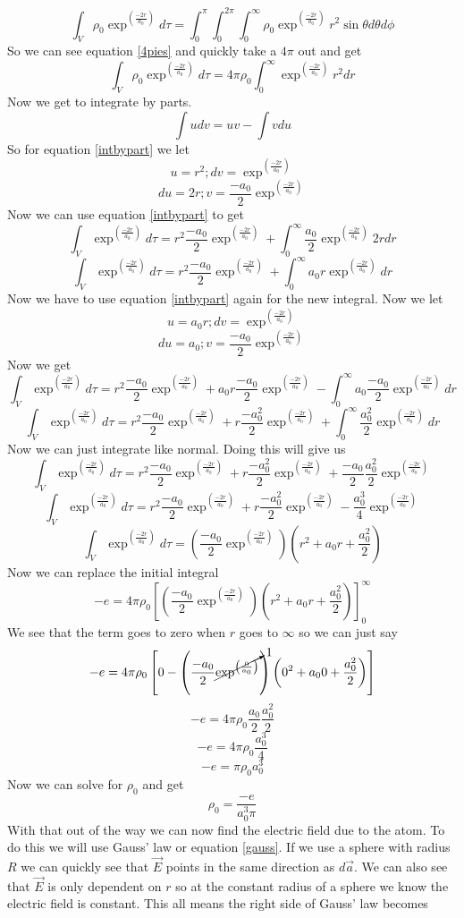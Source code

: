 \documentclass[11pt]{article}
\numberwithin{equation}{section}
\newcommand{\expmess}{\exp^{\left(\frac{-2r}{a_0}\right)}}
\begin{document}
\begin{enumerate}[(a)]
$$\int_V \rho_0\exp^{\left(\frac{-2r}{a_0}\right)}d\tau = \int_0^{\pi}\int_0^{2\pi}\int_0^{\infty} \rho_0\exp^{\left(\frac{-2r}{a_0}\right)} r^2\sin{\theta}d\theta d\phi $$
So we can see equation \ref{4pies} and quickly take a $4\pi$ out and get
$$\int_V \rho_0\exp^{\left(\frac{-2r}{a_0}\right)}d\tau = 4\pi\rho_0\int_0^{\infty} \exp^{\left(\frac{-2r}{a_0}\right)} r^2dr$$
Now we get to integrate by parts. 
\begin{equation}
\int u dv = uv - \int vdu
\label{intbypart}
\end{equation}
So for equation \ref{intbypart} we let
$$u = r^2; dv = \expmess$$
$$du = 2r; v = \frac{-a_0}{2}\expmess$$
Now we can use equation \ref{intbypart} to get
$$\int_V \exp^{\left(\frac{-2r}{a_0}\right)}d\tau = r^2\frac{-a_0}{2}\expmess + \int_0^{\infty}\frac{a_0}{2}\expmess2r dr$$
$$\int_V \exp^{\left(\frac{-2r}{a_0}\right)}d\tau = r^2\frac{-a_0}{2}\expmess + \int_0^{\infty}a_0 r\expmess dr$$
Now we have to use equation \ref{intbypart} again for the new integral. Now we let
$$u = a_0 r; dv = \expmess$$
$$du = a_0; v = \frac{-a_0}{2}\expmess$$
Now we get
$$\int_V \exp^{\left(\frac{-2r}{a_0}\right)}d\tau = r^2\frac{-a_0}{2}\expmess + a_0r\frac{-a_0}{2}\expmess - \int_0^{\infty}a_0 \frac{-a_0}{2}\expmess dr$$
$$\int_V \exp^{\left(\frac{-2r}{a_0}\right)}d\tau = r^2\frac{-a_0}{2}\expmess + r\frac{-a_0^2}{2}\expmess + \int_0^{\infty}\frac{a_0^2}{2}\expmess dr$$
Now we can just integrate like normal. Doing this will give us
$$\int_V \exp^{\left(\frac{-2r}{a_0}\right)}d\tau = r^2\frac{-a_0}{2}\expmess + r\frac{-a_0^2}{2}\expmess + \frac{-a_0}{2}\frac{a_0^2}{2}\expmess$$
$$\int_V \exp^{\left(\frac{-2r}{a_0}\right)}d\tau = r^2\frac{-a_0}{2}\expmess + r\frac{-a_0^2}{2}\expmess - \frac{a_0^3}{4}\expmess$$
$$\int_V \exp^{\left(\frac{-2r}{a_0}\right)}d\tau = \left(\frac{-a_0}{2}\expmess\right)\left(r^2 + a_0 r+ \frac{a_0^2}{2}\right)$$
Now we can replace the initial integral
$$-e = 4\pi\rho_0\left[\left(\frac{-a_0}{2}\expmess\right)\left(r^2 + a_0 r+ \frac{a_0^2}{2}\right)\right]_0^{\infty}$$
We see that the term goes to zero when $r$ goes to $\infty$ so we can just say
$$-e = 4\pi\rho_0\left[0 - \left(\frac{-a_0}{2}\cancelto{1}{\exp^{\left(\frac{0}{a_0}\right)}}\right)\left(0^2 + a_0 0+ \frac{a_0^2}{2}\right)\right]$$
$$-e = 4\pi\rho_0\frac{a_0}{2}\frac{a_0^2}{2}$$
$$-e = 4\pi\rho_0\frac{a_0^3}{4}$$
$$-e = \pi\rho_0 a_0^3$$
Now we can solve for $\rho_0$ and get
\begin{equation}
\rho_0 = \frac{-e}{a_0^3\pi}
\label{rho0}
\end{equation}
With that out of the way we can now find the electric field due to the atom. To do this we will use Gauss' law or equation \ref{gauss}. If we use a sphere with radius $R$ we can quickly see that $\vec{E}$ points in the same direction as $d\vec{a}$. We can also see that $\vec{E}$ is only dependent on $r$ so at the constant radius of a sphere we know the electric field is constant. This all means the right side of Gauss' law becomes

\end{enumerate}
\end{document}

